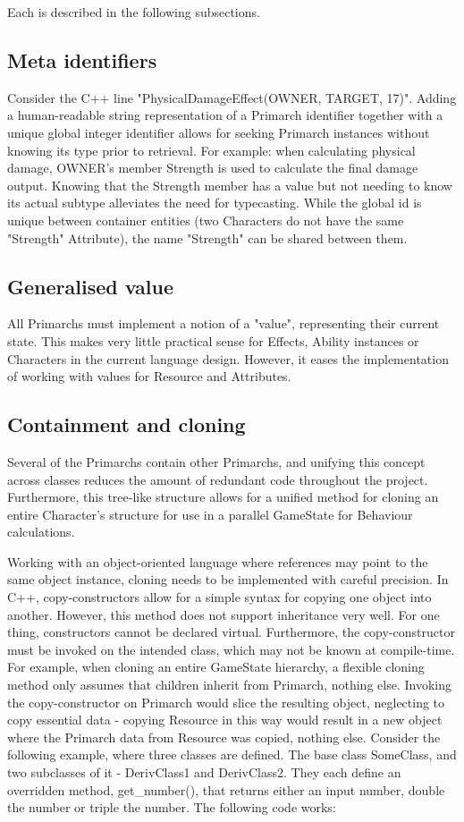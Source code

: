 Each is described in the following subsections.

\subsection{Meta identifiers}
Consider the C++ line "PhysicalDamageEffect(OWNER, TARGET, 17)".
Adding a human-readable string representation of a Primarch identifier together with a unique global integer identifier allows for seeking Primarch instances without knowing its type prior to retrieval. For example: when calculating physical damage, OWNER's member Strength is used to calculate the final damage output. Knowing that the Strength member has a value but not needing to know its actual subtype alleviates the need for typecasting. While the global id is unique between container entities (two Characters do not have the same "Strength" Attribute), the name "Strength" can be shared between them.

\subsection{Generalised value}
All Primarchs must implement a notion of a "value", representing their current state. This makes very little practical sense for Effects, Ability instances or Characters in the current language design. However, it eases the implementation of working with values for Resource and Attributes.

\subsection{Containment and cloning}
Several of the Primarchs contain other Primarchs, and unifying this concept across classes reduces the amount of redundant code throughout the project. Furthermore, this tree-like structure allows for a unified method for cloning an entire Character's structure for use in a parallel GameState for Behaviour calculations.

Working with an object-oriented language where references may point to the same object instance, cloning needs to be implemented with careful precision. In C++, copy-constructors allow for a simple syntax for copying one object into another. However, this method does not support inheritance very well. For one thing, constructors cannot be declared virtual. Furthermore, the copy-constructor must be invoked on the intended class, which may not be known at compile-time. For example, when cloning an entire GameState hierarchy, a flexible cloning method only assumes that children inherit from Primarch, nothing else. Invoking the copy-constructor on Primarch would slice the resulting object, neglecting to copy essential data - copying Resource in this way would result in a new object where the Primarch data from Resource was copied, nothing else. Consider the following example, where three classes are defined. The base class SomeClass, and two subclasses of it - DerivClass1 and DerivClass2. They each define an overridden method, get\_number(), that returns either an input number, double the number or triple the number. The following code works:

